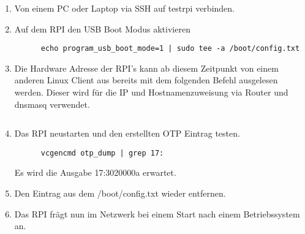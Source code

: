 \begin{enumerate}
\begin{enumerate}
      \item Von einem PC oder Laptop via SSH auf testrpi verbinden.
      \item Auf dem RPI den USB Boot Modus aktivieren
      \begin{verbatim}
      echo program_usb_boot_mode=1 | sudo tee -a /boot/config.txt
      \end{verbatim}
      \item Die Hardware Adresse der RPI's kann ab diesem Zeitpunkt von einem anderen Linux Client aus bereits mit dem folgenden Befehl ausgelesen werden. Dieser wird für die IP und Hostnamenzuweisung via Router und dnsmasq verwendet.
      \begin{verbatim}

      \end{verbatim}
      \item Das RPI neustarten und den erstellten OTP Eintrag testen.
      \begin{verbatim}
      vcgencmd otp_dump | grep 17:
      \end{verbatim}
      Es wird die Ausgabe 17:3020000a erwartet.
      \item Den Eintrag aus dem /boot/config.txt wieder entfernen.
      \item Das RPI frägt nun im Netzwerk bei einem Start nach einem Betriebssystem an.
      \end{enumerate}
   \end{enumerate}
